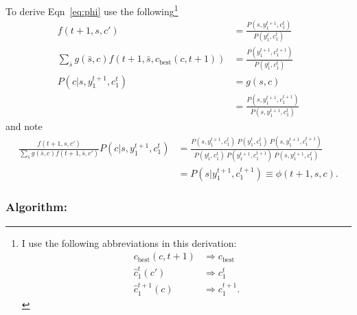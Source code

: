 \documentclass[]{article}
\newcommand{\ts}[3]{#1_{#2}^{#3}}                    %
\newcommand{\cbest}{c_{\text{best}}}
\begin{document}
To derive Eqn~\eqref{eq:phi} use the following\footnote{I use the
  following abbreviations in this derivation:
  \begin{align*}
    \cbest(c,t+1) & \Rightarrow \cbest \\
    \ts{\hat c}{1}{t}(c') & \Rightarrow \ts{c}{1}{t} \\
    \ts{\hat c}{1}{t+1}(c) & \Rightarrow \ts{c}{1}{t+1}.
  \end{align*}
}
\begin{align}
  f(t+1,s,c') &= \frac{P(s,y_1^{t+1},\ts{c}{1}{t})}{P(\ts{y}{1}{t},\ts{c}{1}{t})}\\
  \sum_{\bar s} g(\bar s,c) f(t+1,\bar s, \cbest(c,t+1)) &= \frac{
    P(y_1^{t+1},\ts{c}{1}{t+1})}{P(\ts{y}{1}{t},\ts{c}{1}{t})}\\
  P(c|s,y_1^{t+1},\ts{c}{1}{t}) &= g(s,c) \\
  &= \frac{ P(s,y_1^{t+1},\ts{c}{1}{t+1})}{P(s,y_1^{t+1},\ts{c}{1}{t})}
\end{align}
and note
\begin{align*}
  \frac{f(t+1,s,c')}{\sum_{\bar s} g(\bar s,c) f(t+1,\bar s, c')}
  P(c|s,y_1^{t+1},\ts{c}{1}{t}) &= \frac{P(s,y_1^{t+1},\ts{c}{1}{t})~ P(\ts{y}{1}{t},\ts{c}{1}{t})
    ~ P(s,y_1^{t+1},\ts{c}{1}{t+1})} {P(\ts{y}{1}{t},\ts{c}{1}{t}) ~ P(y_1^{t+1},\ts{c}{1}{t+1})
    ~ P(s,y_1^{t+1},\ts{c}{1}{t})}\\
  &= P(s|y_1^{t+1},\ts{c}{1}{t+1}) \equiv \phi(t+1,s,c).
\end{align*}

\subsubsection*{Algorithm:}
\end{document}
